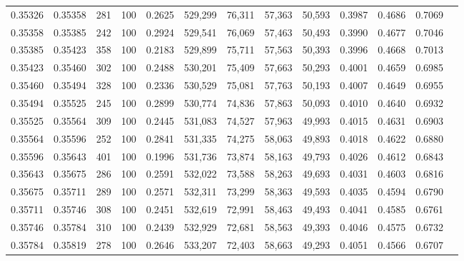 \begin{tabular}{rrrrrrrrrrrrr}
0.35326 & 0.35358 &   281 & 100 &                                     0.2625 & 529,299 &  76,311 &  57,363 &  50,593 & 0.3987 & 0.4686 & 0.7069 \\
0.35358 & 0.35385 &   242 & 100 &                                     0.2924 & 529,541 &  76,069 &  57,463 &  50,493 & 0.3990 & 0.4677 & 0.7046 \\
0.35385 & 0.35423 &   358 & 100 &                                     0.2183 & 529,899 &  75,711 &  57,563 &  50,393 & 0.3996 & 0.4668 & 0.7013 \\
0.35423 & 0.35460 &   302 & 100 &                                     0.2488 & 530,201 &  75,409 &  57,663 &  50,293 & 0.4001 & 0.4659 & 0.6985 \\
0.35460 & 0.35494 &   328 & 100 &                                     0.2336 & 530,529 &  75,081 &  57,763 &  50,193 & 0.4007 & 0.4649 & 0.6955 \\
0.35494 & 0.35525 &   245 & 100 &                                     0.2899 & 530,774 &  74,836 &  57,863 &  50,093 & 0.4010 & 0.4640 & 0.6932 \\
0.35525 & 0.35564 &   309 & 100 &                                     0.2445 & 531,083 &  74,527 &  57,963 &  49,993 & 0.4015 & 0.4631 & 0.6903 \\
0.35564 & 0.35596 &   252 & 100 &                                     0.2841 & 531,335 &  74,275 &  58,063 &  49,893 & 0.4018 & 0.4622 & 0.6880 \\
0.35596 & 0.35643 &   401 & 100 &                                     0.1996 & 531,736 &  73,874 &  58,163 &  49,793 & 0.4026 & 0.4612 & 0.6843 \\
0.35643 & 0.35675 &   286 & 100 &                                     0.2591 & 532,022 &  73,588 &  58,263 &  49,693 & 0.4031 & 0.4603 & 0.6816 \\
0.35675 & 0.35711 &   289 & 100 &                                     0.2571 & 532,311 &  73,299 &  58,363 &  49,593 & 0.4035 & 0.4594 & 0.6790 \\
0.35711 & 0.35746 &   308 & 100 &                                     0.2451 & 532,619 &  72,991 &  58,463 &  49,493 & 0.4041 & 0.4585 & 0.6761 \\
0.35746 & 0.35784 &   310 & 100 &                                     0.2439 & 532,929 &  72,681 &  58,563 &  49,393 & 0.4046 & 0.4575 & 0.6732 \\
0.35784 & 0.35819 &   278 & 100 &                                     0.2646 & 533,207 &  72,403 &  58,663 &  49,293 & 0.4051 & 0.4566 & 0.6707 \\

\end{tabular}
